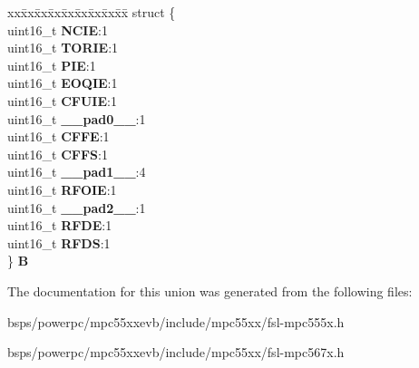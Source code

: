 \begin{DoxyCompactItemize}
\begin{tabbing}
\end{tabbing}\item 
\mbox{\label{unionEQADC__tag_1_1EQADC__IDCR__tag_a75275ee661a87441bc2198c99d01d1e3}} 
\begin{tabbing}
xx\=xx\=xx\=xx\=xx\=xx\=xx\=xx\=xx\=\kill
struct \{\\
\>uint16\_t {\bfseries NCIE}:1\\
\>uint16\_t {\bfseries TORIE}:1\\
\>uint16\_t {\bfseries PIE}:1\\
\>uint16\_t {\bfseries EOQIE}:1\\
\>uint16\_t {\bfseries CFUIE}:1\\
\>uint16\_t {\bfseries \_\_pad0\_\_}:1\\
\>uint16\_t {\bfseries CFFE}:1\\
\>uint16\_t {\bfseries CFFS}:1\\
\>uint16\_t {\bfseries \_\_pad1\_\_}:4\\
\>uint16\_t {\bfseries RFOIE}:1\\
\>uint16\_t {\bfseries \_\_pad2\_\_}:1\\
\>uint16\_t {\bfseries RFDE}:1\\
\>uint16\_t {\bfseries RFDS}:1\\
\} {\bfseries B}\\

\end{tabbing}\end{DoxyCompactItemize}


The documentation for this union was generated from the following files\+:\begin{DoxyCompactItemize}
\item 
bsps/powerpc/mpc55xxevb/include/mpc55xx/fsl-\/mpc555x.\+h\item 
bsps/powerpc/mpc55xxevb/include/mpc55xx/fsl-\/mpc567x.\+h\end{DoxyCompactItemize}
